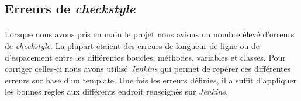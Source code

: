 \subsection{Erreurs de \textit{checkstyle}}

    \paragraph{}
    Lorsque nous avons pris en main le projet nous avions un nombre élevé d'erreurs de \textit{checkstyle}. La plupart étaient des erreurs de longueur de ligne ou de d'espacement entre les différentes boucles, méthodes, variables et classes. Pour corriger celles-ci nous avons utilisé \textit{Jenkins} qui permet de repérer ces différentes erreurs sur base d'un template. Une fois les erreurs définies, il a suffit d'appliquer les bonnes règles aux différents endroit renseignés sur \textit{Jenkins.}